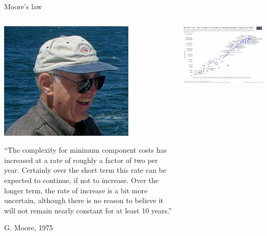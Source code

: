 \documentclass{beamer}
\begin{document}
\begin{frame}{Moore's law}
	\begin{columns}
		\begin{column}{0.4\columnwidth}
		\centering
		\includegraphics[width=0.3\columnwidth]{Gordon_Moore.jpg}
		
		{\small
			``The complexity for minimum component costs has increased at a rate of roughly a factor of two per year. Certainly over the short term this rate can be expected to continue, if not to increase. Over the longer term, the rate of increase is a bit more uncertain, although there is no reason to believe it will not remain nearly constant for at least 10 years.''
		}
	
		{\flushright G. Moore, 1975}
		\end{column}
	\begin{column}{0.6\columnwidth}
		\centering
		\includegraphics[width=\columnwidth]{mooreslawoftransistors.png}
		
	\end{column}
	\end{columns}
\end{frame}
\end{document}
